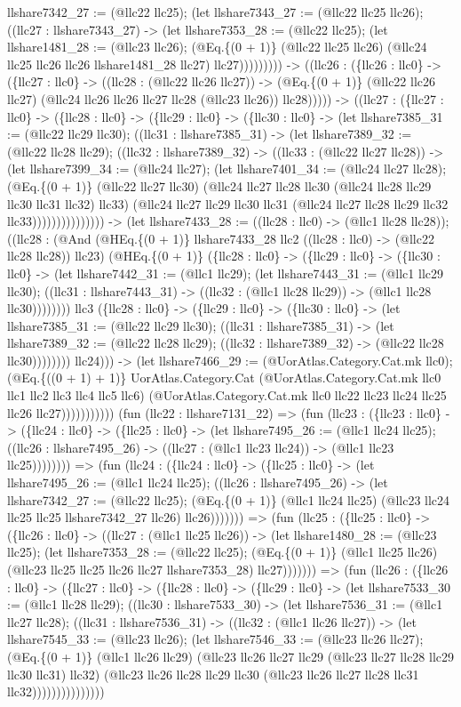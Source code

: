 \documentclass[11pt]{article}
\begin{document}
llshare7342\_27 := (@llc22 llc25); (let llshare7343\_27 := (@llc22 llc25 llc26); ((llc27 : llshare7343\_27) -> (let llshare7353\_28 := (@llc22 llc25); (let llshare1481\_28 := (@llc23 llc26); (@Eq.\{(0 + 1)\} (@llc22 llc25 llc26) (@llc24 llc25 llc26 llc26 llshare1481\_28 llc27) llc27))))))))) -> ((llc26 : (\{llc26 : llc0\} -> (\{llc27 : llc0\} -> ((llc28 : (@llc22 llc26 llc27)) -> (@Eq.\{(0 + 1)\} (@llc22 llc26 llc27) (@llc24 llc26 llc26 llc27 llc28 (@llc23 llc26)) llc28))))) -> ((llc27 : (\{llc27 : llc0\} -> (\{llc28 : llc0\} -> (\{llc29 : llc0\} -> (\{llc30 : llc0\} -> (let llshare7385\_31 := (@llc22 llc29 llc30); ((llc31 : llshare7385\_31) -> (let llshare7389\_32 := (@llc22 llc28 llc29); ((llc32 : llshare7389\_32) -> ((llc33 : (@llc22 llc27 llc28)) -> (let llshare7399\_34 := (@llc24 llc27); (let llshare7401\_34 := (@llc24 llc27 llc28); (@Eq.\{(0 + 1)\} (@llc22 llc27 llc30) (@llc24 llc27 llc28 llc30 (@llc24 llc28 llc29 llc30 llc31 llc32) llc33) (@llc24 llc27 llc29 llc30 llc31 (@llc24 llc27 llc28 llc29 llc32 llc33))))))))))))))) -> (let llshare7433\_28 := ((llc28 : llc0) -> (@llc1 llc28 llc28)); ((llc28 : (@And (@HEq.\{(0 + 1)\} llshare7433\_28 llc2 ((llc28 : llc0) -> (@llc22 llc28 llc28)) llc23) (@HEq.\{(0 + 1)\} (\{llc28 : llc0\} -> (\{llc29 : llc0\} -> (\{llc30 : llc0\} -> (let llshare7442\_31 := (@llc1 llc29); (let llshare7443\_31 := (@llc1 llc29 llc30); ((llc31 : llshare7443\_31) -> ((llc32 : (@llc1 llc28 llc29)) -> (@llc1 llc28 llc30)))))))) llc3 (\{llc28 : llc0\} -> (\{llc29 : llc0\} -> (\{llc30 : llc0\} -> (let llshare7385\_31 := (@llc22 llc29 llc30); ((llc31 : llshare7385\_31) -> (let llshare7389\_32 := (@llc22 llc28 llc29); ((llc32 : llshare7389\_32) -> (@llc22 llc28 llc30)))))))) llc24))) -> (let llshare7466\_29 := (@UorAtlas.Category.Cat.mk llc0); (@Eq.\{((0 + 1) + 1)\} UorAtlas.Category.Cat (@UorAtlas.Category.Cat.mk llc0 llc1 llc2 llc3 llc4 llc5 llc6) (@UorAtlas.Category.Cat.mk llc0 llc22 llc23 llc24 llc25 llc26 llc27))))))))))) (fun (llc22 : llshare7131\_22) => (fun (llc23 : (\{llc23 : llc0\} -> (\{llc24 : llc0\} -> (\{llc25 : llc0\} -> (let llshare7495\_26 := (@llc1 llc24 llc25); ((llc26 : llshare7495\_26) -> ((llc27 : (@llc1 llc23 llc24)) -> (@llc1 llc23 llc25)))))))) => (fun (llc24 : (\{llc24 : llc0\} -> (\{llc25 : llc0\} -> (let llshare7495\_26 := (@llc1 llc24 llc25); ((llc26 : llshare7495\_26) -> (let llshare7342\_27 := (@llc22 llc25); (@Eq.\{(0 + 1)\} (@llc1 llc24 llc25) (@llc23 llc24 llc25 llc25 llshare7342\_27 llc26) llc26))))))) => (fun (llc25 : (\{llc25 : llc0\} -> (\{llc26 : llc0\} -> ((llc27 : (@llc1 llc25 llc26)) -> (let llshare1480\_28 := (@llc23 llc25); (let llshare7353\_28 := (@llc22 llc25); (@Eq.\{(0 + 1)\} (@llc1 llc25 llc26) (@llc23 llc25 llc25 llc26 llc27 llshare7353\_28) llc27))))))) => (fun (llc26 : (\{llc26 : llc0\} -> (\{llc27 : llc0\} -> (\{llc28 : llc0\} -> (\{llc29 : llc0\} -> (let llshare7533\_30 := (@llc1 llc28 llc29); ((llc30 : llshare7533\_30) -> (let llshare7536\_31 := (@llc1 llc27 llc28); ((llc31 : llshare7536\_31) -> ((llc32 : (@llc1 llc26 llc27)) -> (let llshare7545\_33 := (@llc23 llc26); (let llshare7546\_33 := (@llc23 llc26 llc27); (@Eq.\{(0 + 1)\} (@llc1 llc26 llc29) (@llc23 llc26 llc27 llc29 (@llc23 llc27 llc28 llc29 llc30 llc31) llc32) (@llc23 llc26 llc28 llc29 llc30 (@llc23 llc26 llc27 llc28 llc31 llc32))))))))))))))) 
\end{document}
